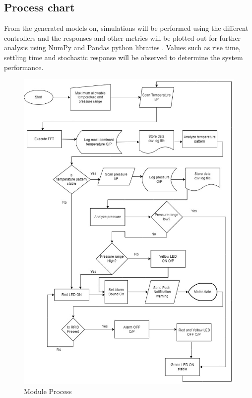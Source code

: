 \subsection{ Process chart}
From the generated models on, simulations will be performed using the different
controllers and the responses and other metrics will be plotted out for further analysis using NumPy and Pandas python libraries .
Values such as rise time, settling time and stochastic response will be observed to determine the system performance.
\begin{figure}
	\centering
	\includegraphics[width=0.7\linewidth]{Figures/model1}
	\caption{Module Process}
	\label{fig:model1}
\end{figure}



